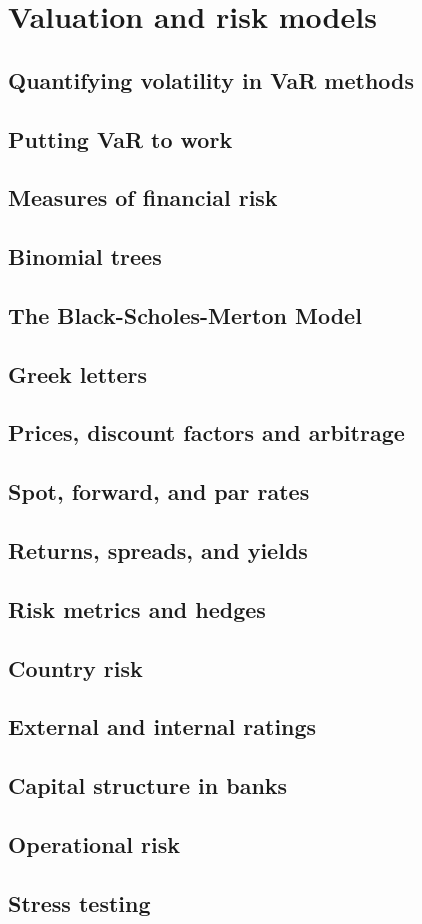 \section{Valuation and risk models}

\subsection{Quantifying volatility in VaR methods}
\subsection{Putting VaR to work}
\subsection{Measures of financial risk}
\subsection{Binomial trees}
\subsection{The Black-Scholes-Merton Model}
\subsection{Greek letters}
\subsection{Prices, discount factors and arbitrage}
\subsection{Spot, forward, and par rates}
\subsection{Returns, spreads, and yields}
\subsection{Risk metrics and hedges}
\subsection{Country risk}
\subsection{External and internal ratings}
\subsection{Capital structure in banks}
\subsection{Operational risk}
\subsection{Stress testing}

